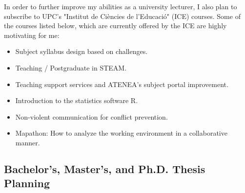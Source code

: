 \documentclass{article}
\begin{document}


In order to further improve my abilities as a university lecturer, I also plan to subscribe to UPC's "Institut de Ciències de l'Educació" (ICE) courses. Some of the courses listed below, which are currently offered by the ICE are highly motivating for me:

\begin{itemize}[noitemsep]
\item Subject syllabus design based on challenges.
\item Teaching / Postgraduate in STEAM.
\item Teaching support services and ATENEA's subject portal improvement. 
\item Introduction to the statistics software R.
\item Non-violent communication for conflict prevention.
\item Mapathon: How to analyze the working environment in a collaborative manner.
\end{itemize}

\subsection{Bachelor's, Master's, and Ph.D. Thesis Planning} 
\end{document}
